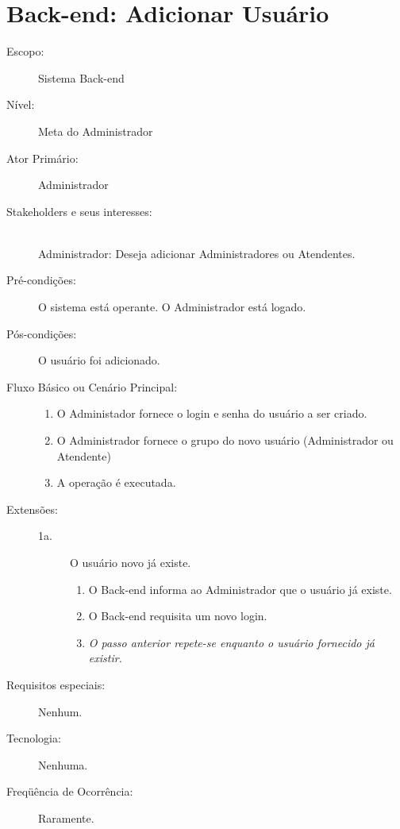 \documentclass[brazil,times]{abnt}
\begin{document}
\section{Back-end: Adicionar Usuário}
\begin{description}
\item[Escopo:] Sistema Back-end
\item[Nível:] Meta do Administrador
\item[Ator Primário:] Administrador
\item[Stakeholders e seus interesses:] \hfill \\
Administrador: Deseja adicionar Administradores ou Atendentes.

\item[Pré-condições:] O sistema está operante. O Administrador está logado.
\item[Pós-condições:] O usuário foi adicionado.
\item[Fluxo Básico ou Cenário Principal:]\hfill
\begin{enumerate}
  \item O Administador fornece o login e senha do usuário a ser criado.
  \item O Administrador fornece o grupo do novo usuário (Administrador ou
  Atendente)
  \item A operação é executada.
\end{enumerate}

\item[Extensões:]\hfill
\begin{description}
	\item[1a.] O usuário novo já existe.
	\begin{enumerate}
 		\item O Back-end informa ao Administrador que o usuário já existe.
 		\item O Back-end requisita um novo login.
 		\item \emph{O passo anterior repete-se enquanto o usuário fornecido já
 		existir.}
	\end{enumerate}

\end{description}
\item[Requisitos especiais:] Nenhum.
\item[Tecnologia:] Nenhuma.
\item[Freqüência de Ocorrência:] Raramente.

\end{description}
\end{document}
